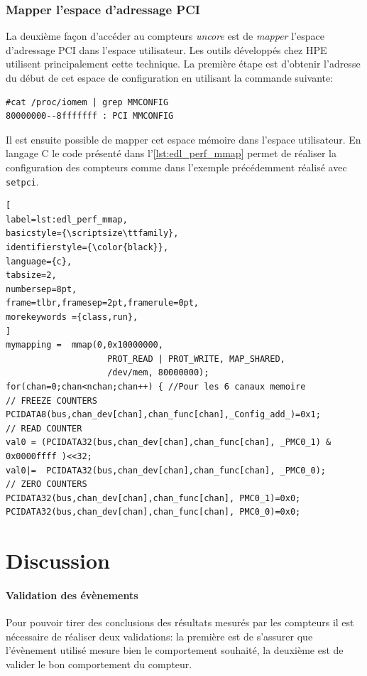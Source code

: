     \subsubsection{Mapper l'espace d'adressage PCI}\label{annexe:hc_pcimap}
        La deuxième façon d'accéder au compteurs \textit{uncore} est de \textit{mapper} l'espace d'adressage PCI dans l'espace utilisateur. Les outils développés chez HPE utilisent principalement cette technique. La première étape est d'obtenir l'adresse du début de cet espace de configuration en utilisant la commande suivante:
\begin{verbatim}
#cat /proc/iomem | grep MMCONFIG  
80000000--8fffffff : PCI MMCONFIG
\end{verbatim}
        Il est ensuite possible de mapper cet espace mémoire dans l'espace utilisateur. En langage C le code présenté dans l'\autoref{lst:edl_perf_mmap} permet de réaliser la configuration des compteurs comme dans l'exemple précédemment réalisé avec \verb|setpci|.
    \begin{lstlisting}[
label=lst:edl_perf_mmap,
basicstyle={\scriptsize\ttfamily},
identifierstyle={\color{black}},
language={c},
tabsize=2,
numbersep=8pt,
frame=tlbr,framesep=2pt,framerule=0pt,
morekeywords ={class,run},
]
mymapping =  mmap(0,0x10000000, 
		            PROT_READ | PROT_WRITE, MAP_SHARED, 		 
		            /dev/mem, 80000000);
for(chan=0;chan<nchan;chan++) { //Pour les 6 canaux memoire 
// FREEZE COUNTERS 
PCIDATA8(bus,chan_dev[chan],chan_func[chan],_Config_add_)=0x1; 
// READ COUNTER 
val0 = (PCIDATA32(bus,chan_dev[chan],chan_func[chan], _PMC0_1) & 0x0000ffff )<<32; 
val0|=  PCIDATA32(bus,chan_dev[chan],chan_func[chan], _PMC0_0); 
// ZERO COUNTERS 
PCIDATA32(bus,chan_dev[chan],chan_func[chan], PMC0_1)=0x0;
PCIDATA32(bus,chan_dev[chan],chan_func[chan], PMC0_0)=0x0;
\end{lstlisting}
    

\section{Discussion}
     
    \paragraph{Validation des évènements}
    
        Pour pouvoir tirer des conclusions des résultats mesurés par les compteurs il est nécessaire de réaliser deux validations: la première est de s'assurer que l'évènement utilisé mesure bien le comportement souhaité, la deuxième est de valider le bon comportement du compteur.
    
